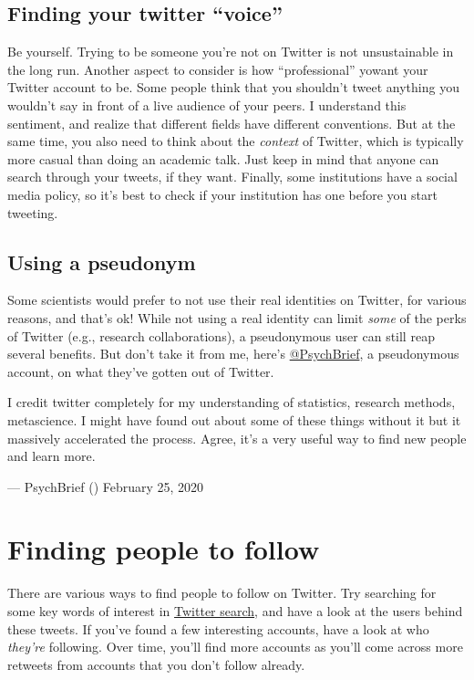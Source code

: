 \documentclass[]{book}
\begin{document}
\hypertarget{finding-your-twitter-voice}{%
\subsection{Finding your twitter ``voice''}\label{finding-your-twitter-voice}}

Be yourself. Trying to be someone you're not on Twitter is not unsustainable in the long run. Another aspect to consider is how ``professional'' yowant your Twitter account to be. Some people think that you shouldn't tweet anything you wouldn't say in front of a live audience of your peers. I understand this sentiment, and realize that different fields have different conventions. But at the same time, you also need to think about the \emph{context} of Twitter, which is typically more casual than doing an academic talk. Just keep in mind that anyone can search through your tweets, if they want. Finally, some institutions have a social media policy, so it's best to check if your institution has one before you start tweeting.

\hypertarget{using-a-pseudonym}{%
\subsection{Using a pseudonym}\label{using-a-pseudonym}}

Some scientists would prefer to not use their real identities on Twitter, for various reasons, and that's ok! While not using a real identity can limit \emph{some} of the perks of Twitter (e.g., research collaborations), a pseudonymous user can still reap several benefits. But don't take it from me, here's \href{https://twitter.com/PsychBrief}{@PsychBrief}, a pseudonymous account, on what they've gotten out of Twitter.

I credit twitter completely for my understanding of statistics, research methods, metascience. I might have found out about some of these things without it but it massively accelerated the process. Agree, it's a very useful way to find new people and learn more.

--- PsychBrief (\citet{PsyBrief}) February 25, 2020

\hypertarget{finding-people-to-follow}{%
\section{Finding people to follow}\label{finding-people-to-follow}}

There are various ways to find people to follow on Twitter. Try searching for some key words of interest in \href{https://help.twitter.com/en/using-twitter/twitter-search}{Twitter search}, and have a look at the users behind these tweets. If you've found a few interesting accounts, have a look at who \emph{they're} following. Over time, you'll find more accounts as you'll come across more retweets from accounts that you don't follow already.
\end{document}
